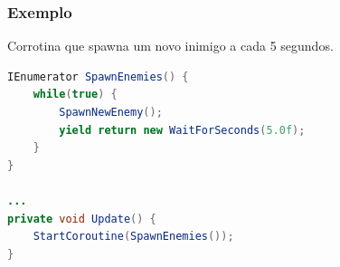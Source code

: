 \documentclass{beamer}
\begin{document}
	\begin{frame}[fragile]
		\frametitle{Exemplo}
		Corrotina que spawna um novo inimigo a cada 5 segundos.
		\begin{lstlisting}[language=Java,basicstyle=\ttfamily,keywordstyle=\color{blue}]
IEnumerator SpawnEnemies() {
    while(true) {
        SpawnNewEnemy();
        yield return new WaitForSeconds(5.0f);
    }
}

...
private void Update() {
    StartCoroutine(SpawnEnemies());
}
		\end{lstlisting}
	\end{frame}
\end{document}
